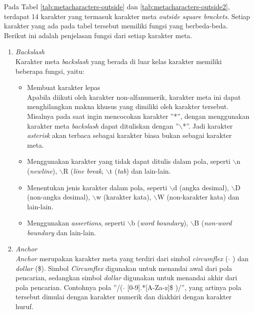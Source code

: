 Pada Tabel \ref{tab:metacharacters-outside} dan \ref{tab:metacharacters-outside2}, terdapat 14 karakter yang termasuk karakter meta \textit{outside square brackets}. Setiap karakter yang ada pada tabel tersebut memiliki fungsi yang berbeda-beda. Berikut ini adalah penjelasan fungsi dari setiap karakter meta.

\begin{enumerate}
	\item \textit{Backslash} \\
	Karakter meta \textit{backslash} yang berada di luar kelas karakter memiliki beberapa fungsi, yaitu:
	\begin{itemize}
		\item Membuat karakter lepas\\
		Apabila diikuti oleh karakter non-alfanumerik, karakter meta ini dapat menghilangkan makna khusus yang dimiliki oleh karakter tersebut. Misalnya pada saat ingin mencocokan karakter ''*'', dengan menggunakan karakter meta \textit{backslash} dapat dituliskan dengan ''$\backslash$*''. Jadi karakter \textit{asterisk} akan terbaca sebagai karakter biasa bukan sebagai karakter meta.
				
		\item Menggunakan karakter yang tidak dapat ditulis dalam pola, seperti $\backslash$n (\textit{newline}), $\backslash$R (\textit{line break}, $\backslash$t (\textit{tab}) dan lain-lain.
		
		\item Menentukan jenis karakter dalam pola, seperti $\backslash$d (angka desimal), $\backslash$D (non-angka desimal), $\backslash$w (karakter kata), $\backslash$W (non-karakter kata) dan lain-lain.
		
		\item Menggunakan \textit{assertions}, seperti $\backslash$b (\textit{word boundary}), $\backslash$B (\textit{non-word boundary} dan lain-lain.
		
	\end{itemize}
	
	\item \textit{Anchor}\\
	\textit{Anchor} merupakan karakter meta yang terdiri dari simbol \textit{circumflex} ( $\hat{}$ ) dan \textit{dollar} (\$). Simbol \textit{Circumflex} digunakan untuk menandai awal dari pola pencarian, sedangkan simbol \textit{dollar} digunakan untuk menandai akhir dari pola pencarian. Contohnya pola ''/( $\hat{}$ [0-9].*[A-Za-z]\$ )/'', yang artinya pola tersebut dimulai dengan karakter numerik dan diakhiri dengan karakter huruf.
	

\end{enumerate}
